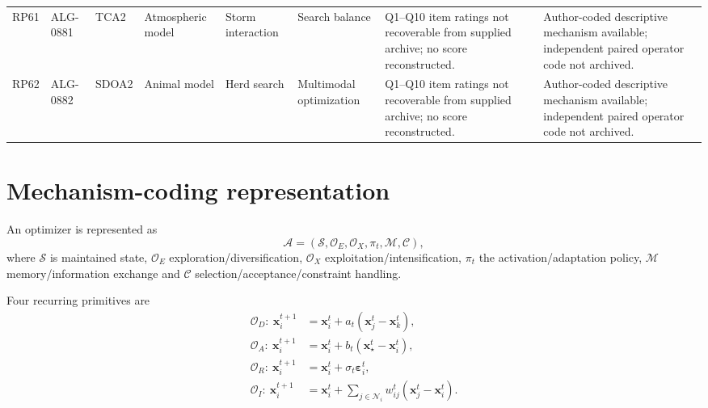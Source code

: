 \documentclass[8pt]{article}
\begin{document}
\begin{landscape}
\begin{longtable}{P{1.0cm}P{1.5cm}P{2.0cm}P{4.0cm}P{4.2cm}P{4.0cm}P{4.0cm}P{3.0cm}}
RP61 & ALG-0881 & TCA2 & Atmospheric model & Storm interaction & Search balance & Q1--Q10 item ratings not recoverable from supplied archive; no score reconstructed. & Author-coded descriptive mechanism available; independent paired operator code not archived. \\
RP62 & ALG-0882 & SDOA2 & Animal model & Herd search & Multimodal optimization & Q1--Q10 item ratings not recoverable from supplied archive; no score reconstructed. & Author-coded descriptive mechanism available; independent paired operator code not archived. \\
\bottomrule\end{longtable}\end{landscape}

\section*{Mechanism-coding representation}
An optimizer is represented as
\[
\mathcal{A}=(\mathcal{S},\mathcal{O}_{E},\mathcal{O}_{X},\pi_t,\mathcal{M},\mathcal{C}),
\]
where $\mathcal{S}$ is maintained state, $\mathcal{O}_{E}$ exploration/diversification, $\mathcal{O}_{X}$ exploitation/intensification, $\pi_t$ the activation/adaptation policy, $\mathcal{M}$ memory/information exchange and $\mathcal{C}$ selection/acceptance/constraint handling.

Four recurring primitives are
\begin{align*}
\mathcal{O}_{D}:~\mathbf{x}_{i}^{t+1}&=\mathbf{x}_{i}^{t}+a_t(\mathbf{x}_{j}^{t}-\mathbf{x}_{k}^{t}),\\
\mathcal{O}_{A}:~\mathbf{x}_{i}^{t+1}&=\mathbf{x}_{i}^{t}+b_t(\mathbf{x}_{\star}^{t}-\mathbf{x}_{i}^{t}),\\
\mathcal{O}_{R}:~\mathbf{x}_{i}^{t+1}&=\mathbf{x}_{i}^{t}+\sigma_t\boldsymbol{\varepsilon}_{i}^{t},\\
\mathcal{O}_{I}:~\mathbf{x}_{i}^{t+1}&=\mathbf{x}_{i}^{t}+\sum_{j\in\mathcal{N}_i}w_{ij}^{t}(\mathbf{x}_{j}^{t}-\mathbf{x}_{i}^{t}).
\end{align*}
\end{document}
